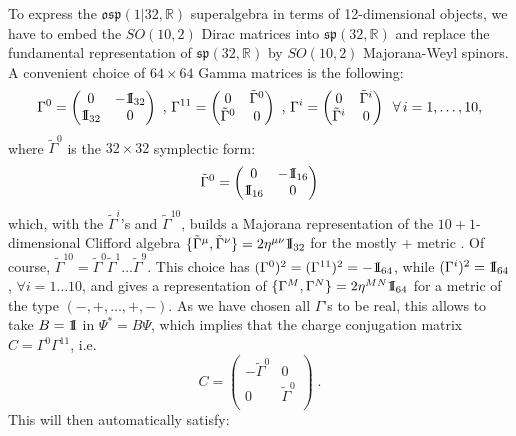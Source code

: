 \documentclass[a4paper,11pt]{article}
\def\Id{{\rm 1\kern-.28em I}}
\begin{document}
To express the $\mathfrak{osp}(1|32,\mathbb{R})$ superalgebra in terms of
12-dimensional objects, we have to embed the $SO(10,2)$ Dirac matrices into
$\mathfrak{sp}(32,\mathbb{R})$ and replace the fundamental representation of
$\mathfrak{sp}(32,\mathbb{R})$ by $SO(10,2)$ Majorana-Weyl spinors. A
convenient choice of $64 \times 64$ Gamma matrices is the following: 
\begin{equation} 
\Gamma^0=\begin{pmatrix} 0 & -\Id_{32} \\ \Id_{32}
& 0 \\\end{pmatrix}  \text{  ,  } \Gamma^{11}=\begin{pmatrix} 0 &
\tilde{\Gamma}^0 \\ \tilde{\Gamma}^0 & 0 \\ \end{pmatrix} \text{  ,  }
\Gamma^i=\begin{pmatrix} 0 & \tilde{\Gamma}^i \\ \tilde{\Gamma}^i & 0 \\
\end{pmatrix}\phantom{a} \forall \, i = 1, \ldots, 10, \end{equation} where
$\tilde{\Gamma}^0$ is the $32 \times 32$ symplectic form: 
$$ \tilde{\Gamma}^0
= \begin{pmatrix} 0 & -\Id_{16} \\ \Id_{16} & 0 \\ \end{pmatrix}
$$
which, with the $\tilde{\Gamma}^i$'s and $\tilde{\Gamma}^{10}$, builds a Majorana representation of the 
$10+1$-dimensional Clifford algebra $\{\tilde{\Gamma}^\mu,\tilde{\Gamma}^\nu\} = 2
\eta^{\mu \nu} \Id_{32}$ for the mostly + metric
. Of course, $\tilde{\Gamma}^{10}= \tilde{\Gamma}^0 \tilde{\Gamma}^1 \ldots \tilde{\Gamma}^9$.
This choice has $(\Gamma^0)^2=(\Gamma^{11})^2=-\Id_{64}$, while $(\Gamma^i)^2=\Id_{64}$, 
$\forall i=1 \dots 10$, and gives a representation of $\{\Gamma^M,\Gamma^N\} = 2 \eta^{MN} \Id_{64}$ 
for a metric of the type $(-,+,\ldots,+,-)$. 
As we have chosen all $\Gamma$'s to be real, this allows to take $B=\Id$ in $\Psi^* = B \Psi$, which implies 
that the charge conjugation matrix $C=\Gamma^{0}\Gamma^{11}$, i.e.
$$
C=\begin{pmatrix}
-\tilde{\Gamma}^0 & 0 \\
0 & \tilde{\Gamma}^0 \\
\end{pmatrix}\;.
$$
This will then automatically satisfy:
\end{document}
